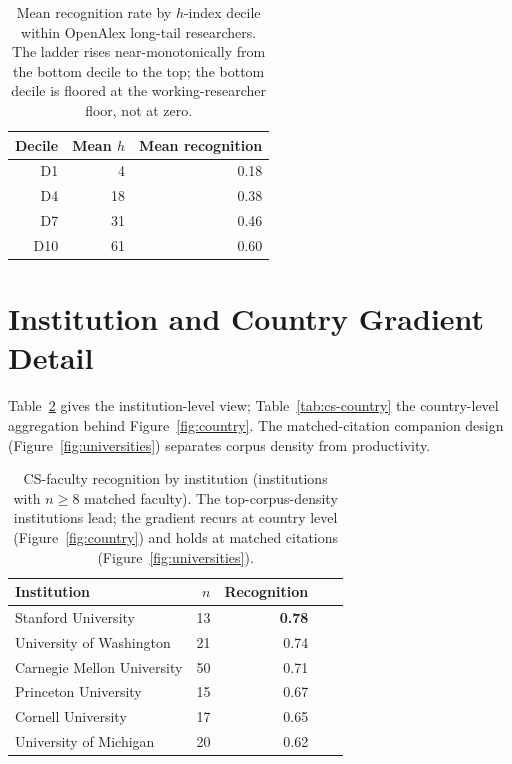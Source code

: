 \begin{table}[!htbp]
\centering
\small
\caption{Mean recognition rate by $h$-index decile within OpenAlex long-tail researchers. The ladder rises near-monotonically from the bottom decile to the top; the bottom decile is floored at the working-researcher floor, not at zero.}
\label{tab:h-index-decile}
\begin{tabular}{rrr}
\toprule
Decile & Mean $h$ & Mean recognition \\
\midrule
D1 & 4 & 0.18 \\
D4 & 18 & 0.38 \\
D7 & 31 & 0.46 \\
D10 & 61 & 0.60 \\
\bottomrule
\end{tabular}
\end{table}

\section{Institution and Country Gradient Detail}
\label{app:geography}

Table~\ref{tab:cs-institution} gives the institution-level view; Table~\ref{tab:cs-country} the country-level aggregation behind Figure~\ref{fig:country}. The matched-citation companion design (Figure~\ref{fig:universities}) separates corpus density from productivity.

\begin{table}[!htbp]
\centering
\small
\caption{CS-faculty recognition by institution (institutions with $n \geq 8$ matched faculty). The top-corpus-density institutions lead; the gradient recurs at country level (Figure~\ref{fig:country}) and holds at matched citations (Figure~\ref{fig:universities}).}
\label{tab:cs-institution}
\begin{tabular}{lrrrr}
\toprule
Institution & $n$ & Recognition \\
\midrule
Stanford University & 13 & \textbf{0.78} \\
University of Washington & 21 & 0.74 \\
Carnegie Mellon University & 50 & 0.71 \\
Princeton University & 15 & 0.67 \\
Cornell University & 17 & 0.65 \\
University of Michigan & 20 & 0.62 \\
\bottomrule
\end{tabular}
\end{table}

